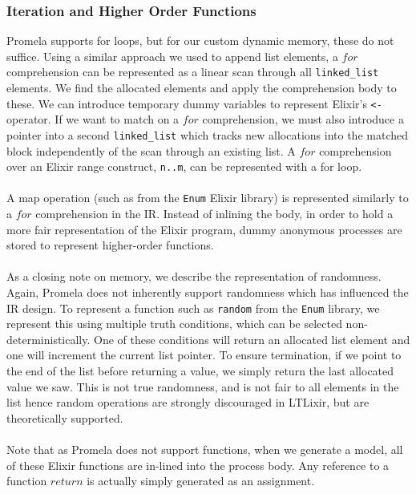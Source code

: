 \subsubsection{Iteration and Higher Order Functions}
Promela supports for loops, but for our custom dynamic memory, these do not suffice. Using a similar approach we used to append list elements, a $for$ comprehension can be represented as a linear scan through all \texttt{linked\_list} elements. We find the allocated elements and apply the comprehension body to these. We can introduce temporary dummy variables to represent Elixir's \texttt{<-} operator. If we want to match on a $for$ comprehension, we must also introduce a pointer into a second \texttt{linked\_list} which tracks new allocations into the matched block independently of the scan through an existing list. A $for$ comprehension over an Elixir range construct, \texttt{n..m}, can be represented with a for loop.
\\ \\
A map operation (such as from the \texttt{Enum} Elixir library) is represented similarly to a $for$ comprehension in the IR. Instead of inlining the body, in order to hold a more fair representation of the Elixir program, dummy anonymous processes are stored to represent higher-order functions.
\\ \\
As a closing note on memory, we describe the representation of randomness. Again, Promela does not inherently support randomness which has influenced the IR design. To represent a function such as \texttt{random} from the \texttt{Enum} library, we represent this using multiple truth conditions, which can be selected non-deterministically. One of these conditions will return an allocated list element and one will increment the current list pointer. To ensure termination, if we point to the end of the list before returning a value, we simply return the last allocated value we saw. This is not true randomness, and is not fair to all elements in the list hence random operations are strongly discouraged in LTLixir, but are theoretically supported.
\\ \\
Note that as Promela does not support functions, when we generate a model, all of these Elixir functions are in-lined into the process body. Any reference to a function $return$ is actually simply generated as an assignment.

